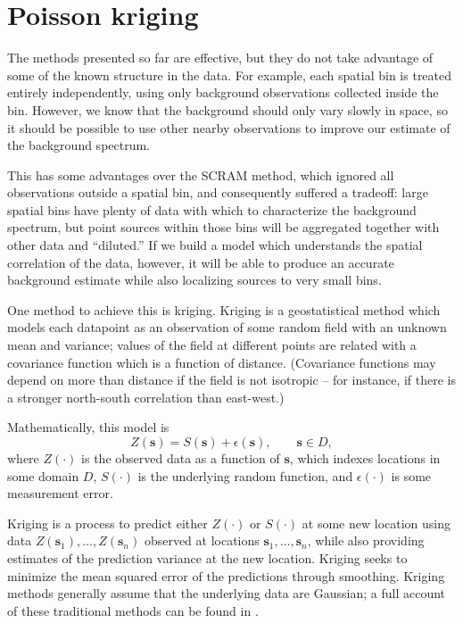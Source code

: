 \chapter{Poisson kriging}\label{kriging}

The methods presented so far are effective, but they do not take advantage of
some of the known structure in the data. For example, each spatial bin is
treated entirely independently, using only background observations collected
inside the bin. However, we know that the background should only vary slowly in
space, so it should be possible to use other nearby observations to improve our
estimate of the background spectrum.

This has some advantages over the SCRAM method, which ignored all observations
outside a spatial bin, and consequently suffered a tradeoff: large spatial bins
have plenty of data with which to characterize the background spectrum, but
point sources within those bins will be aggregated together with other data and
``diluted.'' If we build a model which understands the spatial correlation of
the data, however, it will be able to produce an accurate background estimate
while also localizing sources to very small bins.

One method to achieve this is kriging. Kriging is a geostatistical method which
models each datapoint as an observation of some random field with an unknown
mean and variance; values of the field at different points are related with a
covariance function which is a function of distance. (Covariance functions may
depend on more than distance if the field is not isotropic -- for instance, if
there is a stronger north-south correlation than east-west.)

Mathematically, this model is
\begin{equation}
  Z(\mathbf{s}) = S(\mathbf{s}) + \epsilon(\mathbf{s}), \qquad \mathbf{s} \in D,
\end{equation} 
where \(Z(\cdot)\) is the observed data as a function of \(\mathbf{s}\), which
indexes locations in some domain \(D\), \(S(\cdot)\) is the underlying random
function, and \(\epsilon(\cdot)\) is some measurement error.\cite{Cressie}

Kriging is a process to predict either \(Z(\cdot)\) or \(S(\cdot)\) at some new
location using data \(Z(\mathbf{s}_1),\ldots,Z(\mathbf{s}_n)\) observed at
locations \(\mathbf{s}_1,\ldots,\mathbf{s}_n\), while also providing estimates
of the prediction variance at the new location. Kriging seeks to minimize the
mean squared error of the predictions through smoothing. Kriging methods
generally assume that the underlying data are Gaussian; a full account of these
traditional methods can be found in \cite{Cressie}.

